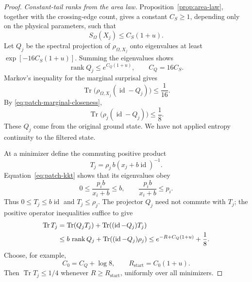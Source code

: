 \documentclass[11pt]{article}
\numberwithin{equation}{section}
\theoremstyle{definition}
\theoremstyle{remark}
\begin{document}
\begin{proof}
\emph{Constant-tail ranks from the area law.}
Proposition~\ref{prop:area-law}, together with the crossing-edge
count, gives a constant \(C_S\geq1\), depending only on the physical
parameters, such that
\[
 S_\Omega(X_j)\leq C_S(1+u).
\]
Let \(Q_j\) be the spectral projection of \(\rho_{\Omega,X_j}\)
onto eigenvalues at least
\(\exp[-16C_S(1+u)]\).  Summing the eigenvalues shows
\[
 \operatorname{rank} Q_j\leq e^{C_Q(1+u)},\qquad C_Q=16C_S.
\]
Markov's inequality for the marginal surprisal gives
\[
 \operatorname{Tr}\bigl(\rho_{\Omega,X_j}(\operatorname{id}-Q_j)\bigr)
       \leq\frac1{16}.
\]
By \eqref{eq:patch-marginal-closeness},
\begin{equation}
 \operatorname{Tr}\bigl(\rho_j(\operatorname{id}-Q_j)\bigr)\leq\frac18.
 \label{eq:patch-constant-tail}
\end{equation}
These \(Q_j\) come from the original ground state.  We have not
applied entropy continuity to the filtered state.

At a minimizer define the commuting positive product
\[
 T_j=\rho_j\,b(x_j+b\operatorname{id})^{-1}.
\]
Equation~\eqref{eq:patch-kkt} shows that its eigenvalues obey
\[
 0\leq \frac{p_i b}{x_i+b}\leq b,
 \qquad
 \frac{p_i b}{x_i+b}\leq p_i.
\]
Thus \(0\leq T_j\leq b\operatorname{id}\) and \(T_j\leq\rho_j\).
The projector \(Q_j\) need not commute with \(T_j\); the positive
operator inequalities suffice to give
\begin{align}
 \operatorname{Tr} T_j
 &=\operatorname{Tr}(Q_jT_j)+\operatorname{Tr}((\operatorname{id}-Q_j)T_j) \notag\\
 &\leq b\,\operatorname{rank} Q_j+
          \operatorname{Tr}((\operatorname{id}-Q_j)\rho_j)
 \leq e^{-R+C_Q(1+u)}+\frac18.
 \label{eq:patch-regulator-trace}
\end{align}
Choose, for example,
\[
 C_0=C_Q+\log8,\qquad R_{\mathrm{start}}=C_0(1+u).
\]
Then \(\operatorname{Tr} T_j\leq1/4\) whenever \(R\geq R_{\mathrm{start}}\),
uniformly over all minimizers.


\end{proof}
\end{document}
